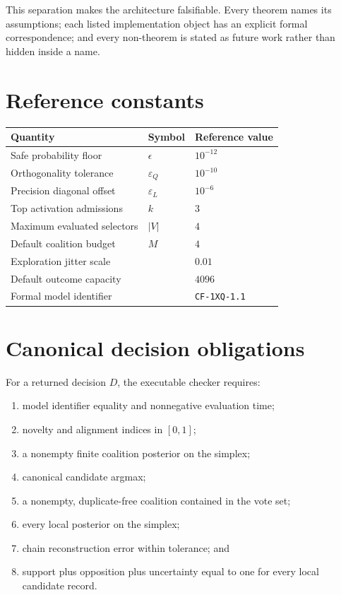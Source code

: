 \documentclass[11pt]{article}
\theoremstyle{definition}
\theoremstyle{plain}
\newcommand{\modelid}{\texttt{CF-1XQ-1.1}}
\begin{document}
This separation makes the architecture falsifiable.  Every theorem names its
assumptions; each listed implementation object has an explicit formal
correspondence; and every non-theorem is stated as future work rather than
hidden inside a name.

\appendix

\section{Reference constants}

\begin{table}[ht]
\centering
\small
\begin{tabular}{lll}
\toprule
Quantity & Symbol & Reference value \\
\midrule
Safe probability floor & $\epsilon$ & $10^{-12}$ \\
Orthogonality tolerance & $\varepsilon_Q$ & $10^{-10}$ \\
Precision diagonal offset & $\varepsilon_L$ & $10^{-6}$ \\
Top activation admissions & $k$ & $3$ \\
Maximum evaluated selectors & $|V|$ & $4$ \\
Default coalition budget & $M$ & $4$ \\
Exploration jitter scale & & $0.01$ \\
Default outcome capacity & & $4096$ \\
Formal model identifier & & \modelid \\
\bottomrule
\end{tabular}
\end{table}

\section{Canonical decision obligations}

For a returned decision $D$, the executable checker requires:
\begin{enumerate}[leftmargin=*,itemsep=1pt]
  \item model identifier equality and nonnegative evaluation time;
  \item novelty and alignment indices in $[0,1]$;
  \item a nonempty finite coalition posterior on the simplex;
  \item canonical candidate argmax;
  \item a nonempty, duplicate-free coalition contained in the vote set;
  \item every local posterior on the simplex;
  \item chain reconstruction error within tolerance; and
  \item support plus opposition plus uncertainty equal to one for every local
  candidate record.
\end{enumerate}
\end{document}
